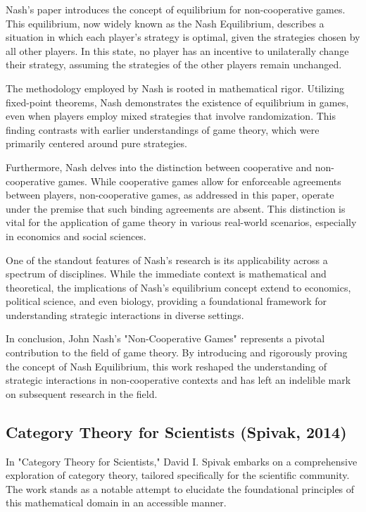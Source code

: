 \documentclass[sn-nature]{sn-jnl}%
\theoremstyle{thmstyleone}%
\theoremstyle{thmstyletwo}%
\theoremstyle{thmstylethree}%
\begin{document}
Nash's paper introduces the concept of equilibrium for non-cooperative games. This equilibrium, now widely known as the Nash Equilibrium, describes a situation in which each player's strategy is optimal, given the strategies chosen by all other players. In this state, no player has an incentive to unilaterally change their strategy, assuming the strategies of the other players remain unchanged.

The methodology employed by Nash is rooted in mathematical rigor. Utilizing fixed-point theorems, Nash demonstrates the existence of equilibrium in games, even when players employ mixed strategies that involve randomization. This finding contrasts with earlier understandings of game theory, which were primarily centered around pure strategies.

Furthermore, Nash delves into the distinction between cooperative and non-cooperative games. While cooperative games allow for enforceable agreements between players, non-cooperative games, as addressed in this paper, operate under the premise that such binding agreements are absent. This distinction is vital for the application of game theory in various real-world scenarios, especially in economics and social sciences.

One of the standout features of Nash's research is its applicability across a spectrum of disciplines. While the immediate context is mathematical and theoretical, the implications of Nash's equilibrium concept extend to economics, political science, and even biology, providing a foundational framework for understanding strategic interactions in diverse settings.

In conclusion, John Nash's "Non-Cooperative Games" represents a pivotal contribution to the field of game theory. By introducing and rigorously proving the concept of Nash Equilibrium, this work reshaped the understanding of strategic interactions in non-cooperative contexts and has left an indelible mark on subsequent research in the field.
\subsection{Category Theory for Scientists (Spivak, 2014)\cite{spivak_category_2014}}

In "Category Theory for Scientists," David I. Spivak embarks on a comprehensive exploration of category theory, tailored specifically for the scientific community. The work stands as a notable attempt to elucidate the foundational principles of this mathematical domain in an accessible manner.
\end{document}
